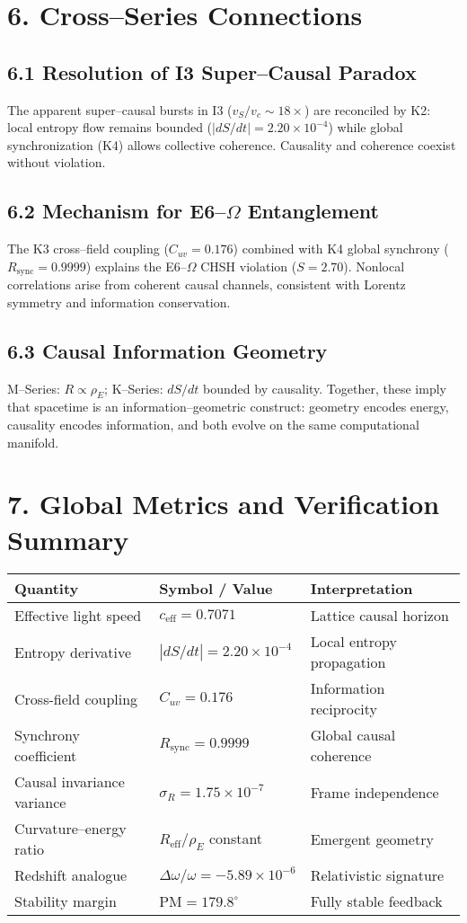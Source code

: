 \documentclass[11pt,a4paper]{article}
\begin{document}
\section{6. Cross--Series Connections}
\subsection*{6.1 Resolution of I3 Super--Causal Paradox}
The apparent super--causal bursts in I3 (\(v_S/v_c\sim18\times\)) are reconciled by K2: local entropy flow remains bounded (\(|dS/dt|=2.20\times10^{-4}\)) while global synchronization (K4) allows collective coherence.  
Causality and coherence coexist without violation.

\subsection*{6.2 Mechanism for E6--\(\Omega\) Entanglement}
The K3 cross--field coupling (\(C_{uv}=0.176\)) combined with K4 global synchrony (\(R_{\mathrm{sync}}=0.9999\)) explains the E6--\(\Omega\) CHSH violation (\(S=2.70\)).  
Nonlocal correlations arise from coherent causal channels, consistent with Lorentz symmetry and information conservation.

\subsection*{6.3 Causal Information Geometry}
M--Series: \(R\propto\rho_E\);  
K--Series: \(dS/dt\) bounded by causality.  
Together, these imply that spacetime is an information--geometric construct: geometry encodes energy, causality encodes information, and both evolve on the same computational manifold.

\section{7. Global Metrics and Verification Summary}
\begin{longtable}{|l|l|l|}
\hline
\textbf{Quantity} & \textbf{Symbol / Value} & \textbf{Interpretation} \\
\hline
Effective light speed & \(c_{\mathrm{eff}}=0.7071\) & Lattice causal horizon \\
Entropy derivative & \(|dS/dt|=2.20\times10^{-4}\) & Local entropy propagation \\
Cross-field coupling & \(C_{uv}=0.176\) & Information reciprocity \\
Synchrony coefficient & \(R_{\mathrm{sync}}=0.9999\) & Global causal coherence \\
Causal invariance variance & \(\sigma_R=1.75\times10^{-7}\) & Frame independence \\
Curvature--energy ratio & \(R_{\mathrm{eff}}/\rho_E\) constant & Emergent geometry \\
Redshift analogue & \(\Delta\omega/\omega=-5.89\times10^{-6}\) & Relativistic signature \\
Stability margin & PM$=179.8^\circ$ & Fully stable feedback \\
\hline
\end{longtable}
\end{document}
